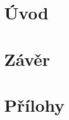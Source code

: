 \documentclass[digital, oneside, table, nolot, nolof]{fithesis3}
\begin{document}

\setlength{\parindent}{0cm}
\setlength{\parskip}{3mm plus2pt minus2pt}
\renewenvironment{compactenum}
	{\begin{enumerate}[leftmargin=8mm,itemsep=0pt,parsep=1pt,topsep=1pt,partopsep=1pt]}
	{\end{enumerate}}
\renewenvironment{compactitem}
	{\begin{itemize}[leftmargin=8mm,itemsep=0pt,parsep=0pt,topsep=1pt,partopsep=1pt]}
	{\end{itemize}}



\chapter{Úvod} \label{chap:uvod}


\chapter{Závěr} \label{chap:zaver}


\printbibliography[heading=bibintoc]

\appendix
\chapter{Přílohy} \label{chap:appendix}

\end{document}
